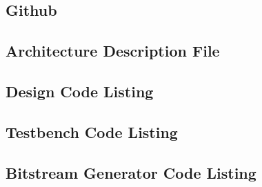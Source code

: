 \documentclass[12pt]{article}
\begin{document}
\subsection{Github}

\subsection{Architecture Description File}



\subsection{Design Code Listing}



\subsection{Testbench Code Listing}


\subsection{Bitstream Generator Code Listing}
\end{document}
